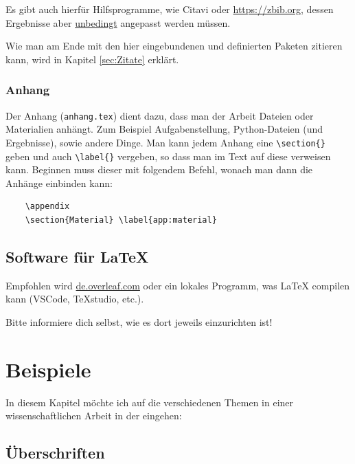Es gibt auch hierfür Hilfsprogramme, wie Citavi oder \url{https://zbib.org}, dessen Ergebnisse aber \textcolor{red1}{\underline{unbedingt}} angepasst werden müssen.

Wie man am Ende mit den hier eingebundenen und definierten Paketen zitieren kann, wird in Kapitel \ref{sec:Zitate} erklärt.


\subsubsection{Anhang}

Der Anhang (\verb|anhang.tex|) dient dazu, dass man der Arbeit Dateien oder Materialien anhängt. Zum Beispiel Aufgabenstellung, Python-Dateien (und Ergebnisse), sowie andere Dinge. Man kann jedem Anhang eine \verb|\section{}| geben und auch \verb|\label{}| vergeben, so dass man im Text auf diese verweisen kann. Beginnen muss dieser mit folgendem Befehl, wonach man dann die Anhänge einbinden kann:

\begin{verbatim}
    \appendix
    \section{Material} \label{app:material}
\end{verbatim}


\subsection{Software für \LaTeX}

Empfohlen wird \href{https://de.overleaf.com/}{de.overleaf.com} oder ein lokales Programm, was \LaTeX{} compilen kann (VSCode, TeXstudio, etc.).

\textcolor{red1}{Bitte informiere dich selbst, wie es dort jeweils einzurichten ist!}

\vfill
\section{Beispiele} \label{sec:Bsp}

In diesem Kapitel möchte ich auf die verschiedenen Themen in einer wissenschaftlichen Arbeit in der  eingehen:


\subsection{Überschriften}

